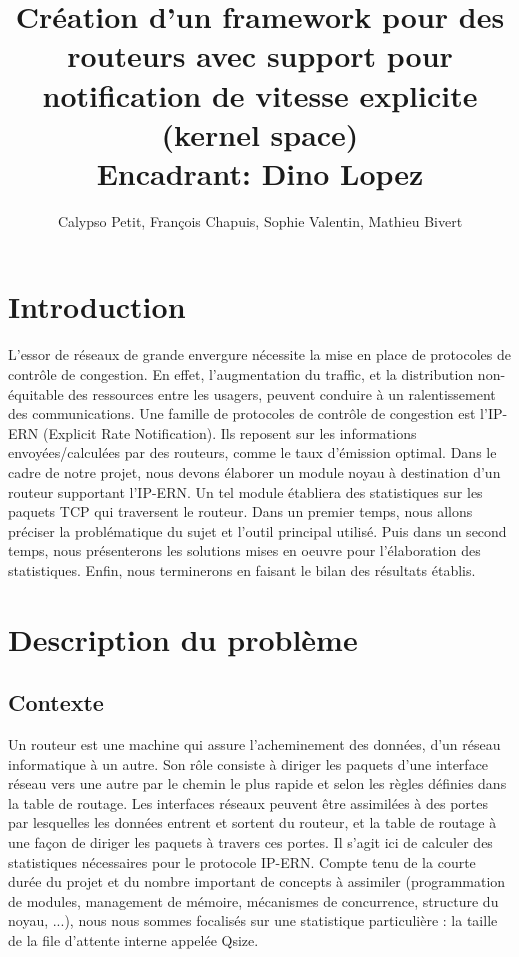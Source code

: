 \documentclass[a4paper]{article}
\title{Création d'un framework pour des routeurs
	avec support pour notification de vitesse explicite
	(kernel space)\\Encadrant: Dino Lopez}
\author{Calypso Petit, François Chapuis, Sophie Valentin, Mathieu Bivert}
\begin{document}
\maketitle
\tableofcontents

\section{Introduction}

L'essor de réseaux de grande envergure nécessite la mise en
place de protocoles de contrôle de congestion. En effet,
l'augmentation du traffic, et la distribution non-équitable
des ressources entre les usagers, peuvent conduire à un
ralentissement des communications.
Une famille de protocoles de contrôle de congestion est l'IP-ERN
(Explicit Rate Notification). Ils reposent sur les informations
envoyées/calculées par des routeurs, comme le taux d'émission
optimal. Dans le cadre de notre projet, nous devons élaborer un
module noyau à destination d'un routeur supportant l'IP-ERN.
Un tel module établiera des statistiques sur les paquets TCP 
qui traversent le routeur. Dans un premier temps, nous allons préciser
la problématique du sujet et l'outil principal utilisé. Puis dans un
second temps, nous présenterons les solutions mises en oeuvre pour 
l'élaboration des statistiques. Enfin, nous terminerons en faisant le
bilan des résultats établis.

\section{Description du problème}
\subsection{Contexte}
Un routeur est une machine qui assure l’acheminement des données,
d'un réseau informatique à un autre. Son rôle consiste à diriger
les paquets d'une interface réseau vers une autre par le chemin
le plus rapide et selon les règles définies dans la table de
routage. 
Les interfaces réseaux peuvent être assimilées à des
portes par lesquelles les données entrent et sortent du routeur, et
la table de routage à une façon de diriger les paquets à travers
ces portes. 
Il s'agit ici de calculer des statistiques nécessaires 
pour le protocole IP-ERN. Compte tenu de la courte durée du projet et 
du nombre important de concepts à assimiler (programmation de modules,
management de mémoire, mécanismes de concurrence, structure du noyau, ...),
nous nous sommes focalisés sur une statistique particulière : la taille
de la file d'attente interne appelée Qsize.
\end{document}
